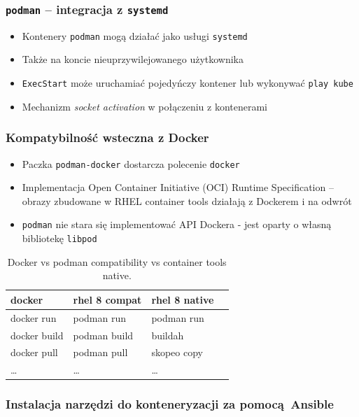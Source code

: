 \documentclass[dvipsnames,table]{beamer}
\begin{document}
\begin{frame}[fragile]
	\frametitle{{\tt podman} -- integracja z {\tt systemd}}
	\begin{itemize}
		\item Kontenery {\tt podman} mogą działać jako usługi {\tt systemd}
		\item Także na koncie nieuprzywilejowanego użytkownika
		\item {\tt ExecStart} może uruchamiać pojedyńczy kontener lub wykonywać {\tt play kube}
		\item Mechanizm {\em socket activation} w połączeniu z kontenerami
	\end{itemize}

\end{frame}

\begin{frame}
	\frametitle{Kompatybilność wsteczna z Docker}
	\begin{itemize}
		\item Paczka {\tt podman-docker} dostarcza polecenie {\tt docker}
		\item Implementacja Open Container Initiative (OCI) Runtime Specification -- obrazy zbudowane w RHEL container tools działają z Dockerem i na odwrót
		\item {\tt podman} nie stara się implementować API Dockera - jest oparty o własną bibliotekę {\tt libpod}
	\end{itemize}
\centering
	\begin{table}
\caption{Docker vs podman compatibility vs container tools native.}
\label{porownanie}
\scriptsize
\begin{tabular}{llll}
\hline
docker & rhel 8 compat & rhel 8 native   \\ \hline
	docker run & podman run & podman run \\
	docker build & podman build & buildah  \\
	docker pull & podman pull & skopeo copy \\ 
	\ldots & \ldots & \ldots \\ \hline
\end{tabular}
\normalsize
\end{table}
\end{frame}

\begin{frame}[fragile]
	\frametitle{Instalacja narzędzi do konteneryzacji za pomocą Ansible}
	
\end{frame}
\end{document}
